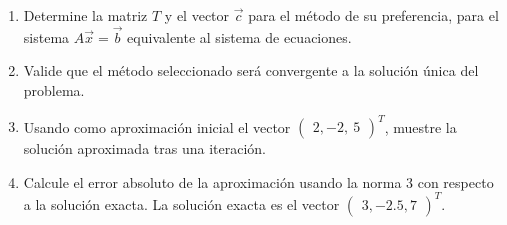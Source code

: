 \documentclass[12pt]{article}
\begin{document}
\begin{enumerate}[leftmargin=*,widest=9]
   \begin{enumerate}[label=\alph*]

   \item Determine la matriz \(T\) y el vector \(\vec{c}\) para el método de su preferencia, para el sistema \(A\vec{x}=\vec{b}\) equivalente al sistema de ecuaciones.

   \item Valide que el método seleccionado será convergente a la solución única del problema.

   \item Usando como aproximación inicial el vector \( \begin{pmatrix} 2, -2, \ 5 \end{pmatrix}^T \), muestre la solución aproximada tras una iteración.

   \item Calcule el error absoluto de la aproximación usando la norma 3 con respecto a la solución exacta. La solución exacta es el vector
   \( \begin{pmatrix} 3, -2.5, 7 \end{pmatrix}^T \).

\end{enumerate}

   \end{enumerate}
\end{document}
